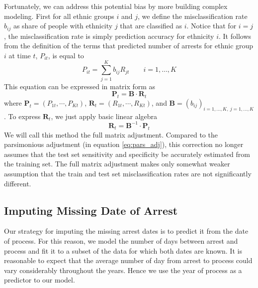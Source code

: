 Fortunately, we can address this potential bias by more building complex modeling.
First for all ethnic groups $i$ and $j$, we define the misclassification rate $b_{ij}$ as share of people with ethnicity $j$ that are classified as $i$.
Notice that for $i = j$, the misclassification rate is simply prediction accuracy for ethnicity $i$.
It follows from the definition of the terms that predicted number of arrests for ethnic group $i$ at time $t$,  $P_{it}$, is equal to 
\begin{equation}
P_{it}  = \sum_{j = 1}^{K} b_{ij} R_{jt} \qquad i = 1, \dots, K
\end{equation}
This equation can be expressed in matrix form as
\begin{equation}
 \mathbf{P}_t = \mathbf{B} \cdot \mathbf{R}_t 
\end{equation}
where $\mathbf{P}_t = \left(P_{1t}, \cdots, P_{Kt} \right)$, $\mathbf{R}_t = \left(R_{1t}, \cdots, R_{Kt} \right)$, and $\mathbf{B} = \left(b_{ij}\right)_{i = 1, \dots, K,\:j = 1, \dots, K}$.
To express $\mathbf{R}_t$, we just  apply basic linear algebra
\begin{equation} \label{eq:full_matrix_adj}
\mathbf{R}_t  = \mathbf{B}^{-1} \cdot  \mathbf{P}_t
\end{equation}
We will call this method the full matrix adjustment. Compared to the parsimonious adjustment (in equation \ref{eq:pars_adj}), this correction no longer assumes that the test set sensitivity and specificity be accurately estimated  from the training set.  The full matrix adjustment
makes only somewhat weaker assumption that the train and test set misclassification rates are not significantly different. 







\subsection{Imputing Missing Date of Arrest} \label{subsec:imputing_missing_date}
Our strategy for imputing the missing arrest dates is to  predict it from the date of process. For this reason, we model the number of days between arrest and process and fit it to a subset of the data for which both dates are known. It  is reasonable to expect that the average number of day from  arrest to process could  vary considerably throughout the years.    %
Hence we use the year of process as a predictor to our model. 

